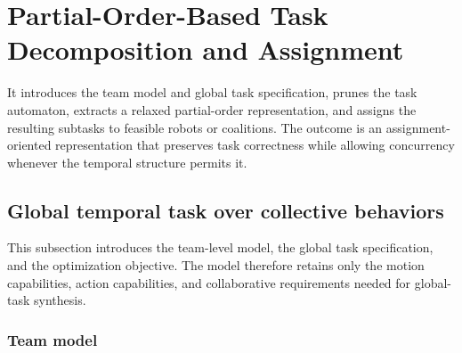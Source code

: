 \section{Partial-Order-Based Task Decomposition and Assignment}
\label{ch04:sec:po_decomp_assignment}

It introduces the team model and global task specification, prunes the task
automaton, extracts a relaxed partial-order representation, and assigns the
resulting subtasks to feasible robots or coalitions. The outcome is an
assignment-oriented representation that preserves task correctness while
allowing concurrency whenever the temporal structure permits it.



\subsection{Global temporal task over collective behaviors}
\label{ch04:subsec:problem_statement}

This subsection introduces the team-level model, the global task specification,
and the optimization objective. 
The model therefore retains only the motion capabilities, action capabilities,
and collaborative requirements needed for global-task synthesis.

\subsubsection{Team model}
\label{ch04:subsubsec:team_model}

